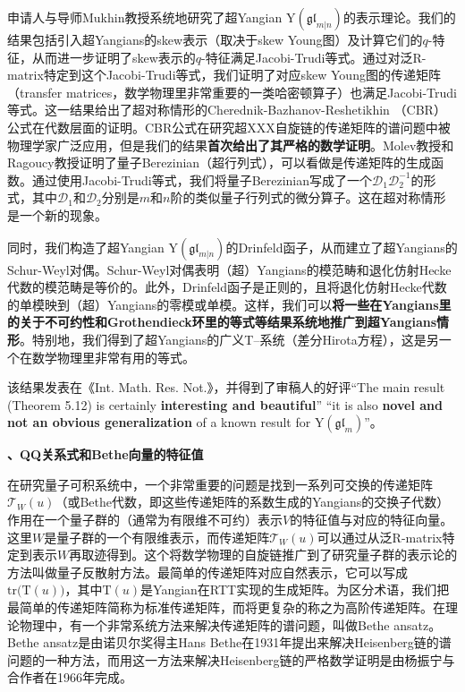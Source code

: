 \documentclass[12pt,UTF8,AutoFakeBold=4,a4paper]{ctexart}
\begin{document}
申请人与导师Mukhin教授系统地研究了超Yangian $\mathrm{Y}(\mathfrak{gl}_{m|n})$的表示理论。我们的结果包括引入超Yangians的skew表示（取决于skew Young图）及计算它们的$q$-特征，从而进一步证明了skew表示的$q$-特征满足Jacobi-Trudi等式。通过对泛R-matrix特定到这个Jacobi-Trudi等式，我们证明了对应skew Young图的传递矩阵（transfer matrices，数学物理里非常重要的一类哈密顿算子）也满足Jacobi-Trudi等式。这一结果给出了超对称情形的Cherednik-Bazhanov-Reshetikhin （CBR）公式在代数层面的证明。CBR公式在研究超XXX自旋链的传递矩阵的谱问题中被物理学家广泛应用，但是我们的结果\textbf{首次给出了其严格的数学证明}。Molev教授和Ragoucy教授证明了量子Berezinian（超行列式），可以看做是传递矩阵的生成函数。通过使用Jacobi-Trudi等式，我们将量子Berezinian写成了一个$\mathcal D_1\mathcal D_2^{-1}$的形式，其中$\mathcal D_1$和$\mathcal D_2$分别是$m$和$n$阶的类似量子行列式的微分算子。这在超对称情形是一个新的现象。

同时，我们构造了超Yangian $\mathrm{Y}(\mathfrak{gl}_{m|n})$的Drinfeld函子，从而建立了超Yangians的Schur-Weyl对偶。Schur-Weyl对偶表明（超）Yangians的模范畴和退化仿射Hecke代数的模范畴是等价的。此外，Drinfeld函子是正则的，且将退化仿射Hecke代数的单模映到（超）Yangians的零模或单模。这样，我们可以\textbf{将一些在Yangians里的关于不可约性和Grothendieck环里的等式等结果系统地推广到超Yangians情形}。特别地，我们得到了超Yangians的广义T--系统（差分Hirota方程），这是另一个在数学物理里非常有用的等式。

该结果发表在《Int. Math. Res. Not.》，并得到了审稿人的好评“The main result (Theorem 5.12) is certainly \textbf{interesting and
beautiful}” “it is also \textbf{novel and not an obvious generalization} of a known
result for $\mathrm{Y}(\mathfrak{gl}_m)$”。


\medskip

\textbf{、QQ关系式和Bethe向量的特征值}

在研究量子可积系统中，一个非常重要的问题是找到一系列可交换的传递矩阵$\mathcal T_W(u)$（或Bethe代数，即这些传递矩阵的系数生成的Yangians的交换子代数）作用在一个量子群的（通常为有限维不可约）表示$V$的特征值与对应的特征向量。这里$W$是量子群的一个有限维表示，而传递矩阵$\mathcal T_W(u)$可以通过从泛R-matrix特定到表示$W$再取迹得到。这个将数学物理的自旋链推广到了研究量子群的表示论的方法叫做量子反散射方法。最简单的传递矩阵对应自然表示，它可以写成$\mathrm{tr}\big(\mathrm T(u)\big)$，其中$\mathrm T(u)$是Yangian在RTT实现的生成矩阵。为区分术语，我们把最简单的传递矩阵简称为标准传递矩阵，而将更复杂的称之为高阶传递矩阵。在理论物理中，有一个非常系统方法来解决传递矩阵的谱问题，叫做Bethe ansatz。Bethe ansatz是由诺贝尔奖得主Hans Bethe在1931年提出来解决Heisenberg链的谱问题的一种方法，而用这一方法来解决Heisenberg链的严格数学证明是由杨振宁与合作者在1966年完成。
\end{document}

